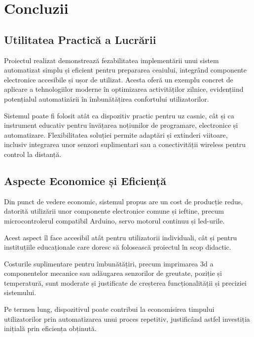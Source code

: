 \chapter{Concluzii}

\section{Utilitatea Practică a Lucrării}

Proiectul realizat demonstrează fezabilitatea %
implementării unui sistem automatizat simplu %
și eficient pentru prepararea ceaiului, %
integrând componente electronice accesibile %
și ușor de utilizat. Acesta oferă un %
exemplu concret de aplicare %
a tehnologiilor moderne în optimizarea %
activităților zilnice, evidențiind potențialul %
automatizării în îmbunătățirea confortului %
utilizatorilor.  

Sistemul poate fi folosit atât ca dispozitiv %
practic pentru uz casnic, cât și ca instrument %
educativ pentru învățarea noțiunilor de %
programare, electronice și automatizare. %
Flexibilitatea soluției permite adaptări și %
extinderi viitoare, inclusiv integrarea unor %
senzori suplimentari sau a conectivității %
wireless pentru control la distanță.

\section{Aspecte Economice și Eficiență}

Din punct de vedere economic, sistemul propus %
are un cost de producție redus, datorită %
utilizării unor componente electronice %
comune și ieftine, precum microcontrolerul %
compatibil Arduino, servo motorul continuu %
și \gls{led}-urile. %
 
Acest aspect îl face accesibil atât pentru %
utilizatorii individuali, cât și pentru %
instituțiile educaționale care doresc să %
folosească proiectul în scop didactic.  

Costurile suplimentare pentru îmbunătățiri, %
precum imprimarea \gls{3d} a componentelor %
mecanice sau adăugarea senzorilor de %
greutate, poziție și temperatură, sunt %
moderate și justificate de creșterea %
funcționalității și preciziei sistemului.  

Pe termen lung, dispozitivul poate contribui %
la economisirea timpului utilizatorilor prin %
automatizarea unui proces repetitiv, %
justificând astfel investiția inițială %
prin eficiența obținută.  

